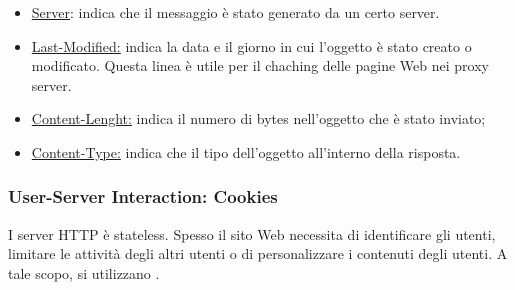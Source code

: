 \documentclass{book}
\newcommand{\tmtextbf}[1]{\text{{\bfseries{#1}}}}
\begin{document}
\begin{itemize}
\begin{itemize}
    \item {\underline{Server}}: indica che il messaggio {\`e} stato generato
    da un certo server.
    
    \item {\underline{Last-Modified:}} indica la data e il giorno in cui
    l'oggetto {\`e} stato creato o modificato. Questa linea {\`e} utile per il
    chaching delle pagine Web nei proxy server.
    
    \item {\underline{Content-Lenght:}} indica il numero di bytes nell'oggetto
    che {\`e} stato inviato;
    
    \item {\underline{Content-Type:}} indica che il tipo dell'oggetto
    all'interno della risposta.
  \end{itemize}
\end{itemize}
{}

\subsubsection{User-Server Interaction: Cookies}

I server HTTP {\`e} stateless. Spesso il sito Web necessita di identificare
gli utenti, limitare le attivit{\`a} degli altri utenti o di personalizzare i
contenuti degli utenti. A tale scopo, si utilizzano \tmtextbf{cookies}.
\end{document}
